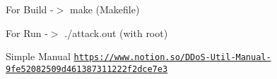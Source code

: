 For Build -\/$>$ make (Makefile)

For Run -\/$>$ ./attack.out (with root)

Simple Manual \href{https://www.notion.so/DDoS-Util-Manual-9fe52082509d461387311222f2dce7e3}{\tt https\+://www.\+notion.\+so/\+D\+Do\+S-\/\+Util-\/\+Manual-\/9fe52082509d461387311222f2dce7e3} 